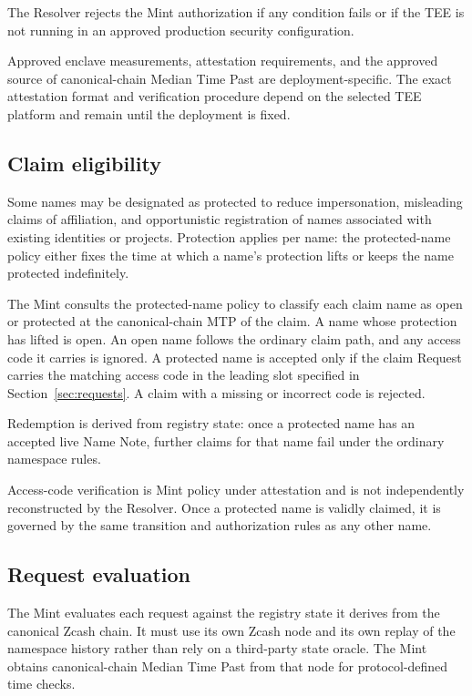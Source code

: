 The Resolver rejects the Mint authorization if any condition fails or if the TEE is not running in an approved production security configuration.

Approved enclave measurements, attestation requirements, and the approved source of canonical-chain Median Time Past are deployment-specific. The exact attestation format and verification procedure depend on the selected TEE platform and remain \openstatus{} until the deployment is fixed.

\subsection{Claim eligibility}

Some names may be designated as protected to reduce impersonation, misleading claims of affiliation, and opportunistic registration of names associated with existing identities or projects. Protection applies per name: the protected-name policy either fixes the time at which a name's protection lifts or keeps the name protected indefinitely.

The Mint consults the protected-name policy to classify each claim name as open or protected at the canonical-chain MTP of the claim. A name whose protection has lifted is open. An open name follows the ordinary claim path, and any access code it carries is ignored. A protected name is accepted only if the claim Request carries the matching access code in the leading slot specified in Section~\ref{sec:requests}. A claim with a missing or incorrect code is rejected.

Redemption is derived from registry state: once a protected name has an accepted live Name Note, further claims for that name fail under the ordinary namespace rules.

Access-code verification is Mint policy under attestation and is not independently reconstructed by the Resolver. Once a protected name is validly claimed, it is governed by the same transition and authorization rules as any other name.

\subsection{Request evaluation}

The Mint evaluates each request against the registry state it derives from the canonical Zcash chain. It must use its own Zcash node and its own replay of the namespace history rather than rely on a third-party state oracle. The Mint obtains canonical-chain Median Time Past from that node for protocol-defined time checks.


